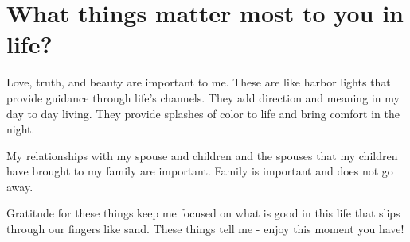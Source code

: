 \section{What things matter most to you in life?}
Love, truth, and beauty are important to me.
These are like harbor lights that provide guidance through life's channels.
They add direction and meaning in my day to day living.
They provide splashes of color to life and bring comfort in the night.

My relationships with my spouse and children and the spouses that my children have brought to my family are important.
Family is important and does not go away.

Gratitude for these things keep me focused on what is good in this life that slips through our fingers like sand.
These things tell me - enjoy this moment you have!





